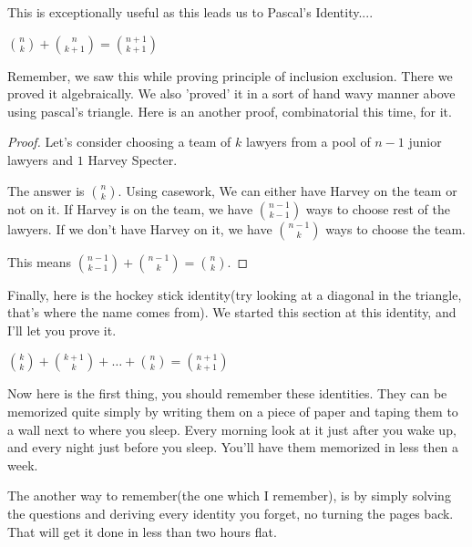 This is exceptionally useful as this leads us to Pascal's Identity....
\begin{theorem}
    $\binom{n}{k} + \binom{n}{k+1}=\binom{n+1}{k+1}$
\end{theorem}
Remember, we saw this while proving principle of inclusion exclusion. 
There we proved it algebraically. We also 'proved' it in a sort of hand wavy manner 
above using pascal's triangle. Here is an another proof, combinatorial this time, for it.
\begin{proof}
    Let's consider choosing a team of $k$ lawyers from a pool of $n-1$ junior lawyers and $1$ Harvey Specter.\par
    The answer is $\binom{n}{k}$. Using casework, We can either have Harvey on the 
    team or not on it. If Harvey is on the team, we have $\binom{n-1}{k-1}$ ways to 
    choose rest of the lawyers. If we don't have Harvey on it, we have $\binom{n-1}{k}$ ways to 
    choose the team.\par
    This means $\binom{n-1}{k-1}+\binom{n-1}{k}=\binom{n}{k}$.
\end{proof}
Finally, here is the hockey stick identity(try looking at a diagonal 
in the triangle, that's where the name comes from). We started this 
section at this identity, and I'll let you prove it.
\begin{theorem}
    $\binom{k}{k}+\binom{k+1}{k}+ \dots +\binom{n}{k}=\binom{n+1}{k+1}$
\end{theorem}
Now here is the first thing, you should remember these identities. They can be memorized 
quite simply by writing them on a piece of paper and taping them to a wall next to where 
you sleep. Every morning look at it just after you wake up, and every night just before you 
sleep. You'll have them memorized in less then a week.\par
The another way to remember(the one which I remember), is by simply solving the questions and 
deriving every identity you forget, no turning the pages back. That will get it done in less 
than two hours flat.
